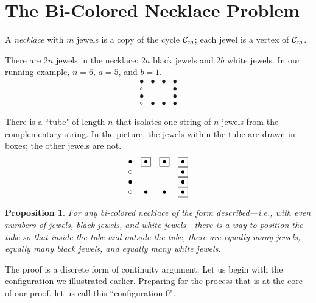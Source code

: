 \documentclass{article}
\newtheorem{prop}{Proposition}
\begin{document}
\section{The Bi-Colored Necklace Problem}


A {\it necklace} with $m$ jewels is a copy of the cycle $\mbox{$\cal C$}_m$; each jewel is a vertex of $\mbox{$\cal C$}_m$.

There are $2n$ jewels in the necklace: $2a$ black jewels and $2b$ white jewels.  In our running example, $n = 6$, $a = 5$, and $b =1$.
\[
\begin{array}{cccc}
\bullet & \bullet  & \bullet & \bullet  \\
\circ    &             &            & \bullet  \\
\bullet &             &            & \bullet  \\
\circ    &  \bullet  & \bullet & \bullet
\end{array}
\]

\smallskip

There is a ``tube" of length $n$ that isolates one string of $n$ jewels from the complementary string.  In the picture, the jewels within the tube are drawn in boxes; the other jewels are not.
\[
\begin{array}{cccc}
\bullet & \fbox{$\bullet$} & \fbox{$\bullet$} & \fbox{$\bullet$}  \\
\circ    &                          &                          & \fbox{$\bullet$}  \\
\bullet &                          &                          & \fbox{$\bullet$}  \\
\circ    &  \bullet              &   \bullet              & \fbox{$\bullet$}
\end{array}
\]

\smallskip

\begin{prop}
For any bi-colored necklace of the form described---i.e., with even numbers of jewels, black jewels, and white jewels---there is a way to position the tube so that inside the tube and outside the tube, there are equally many jewels, equally many black jewels, and equally many white jewels.
\end{prop} 

The proof is a discrete form of continuity argument.  Let us begin with the configuration we illustrated earlier.  Preparing for the process that is at the core of our proof, let us call this ``configuration $0$".
\end{document}

